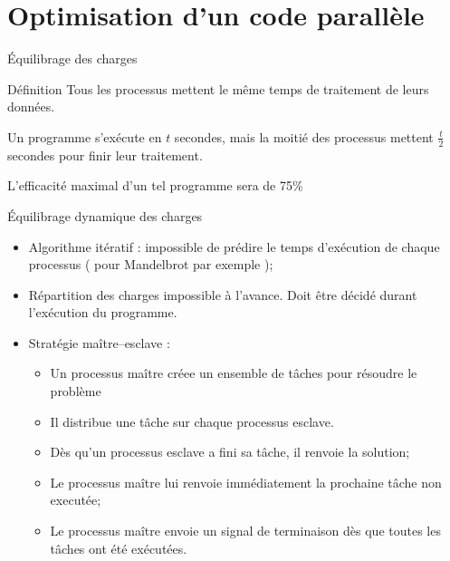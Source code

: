 \documentclass[handout]{beamer}
\begin{document}
\section{Optimisation d'un code parallèle}
\begin{frame}[fragile]{\'Equilibrage des charges}

\begin{block}{Définition}
Tous les processus mettent le même temps de traitement de leurs
données.
\end{block}

\begin{example}
Un programme s'exécute en $t$ secondes, mais la moitié des processus
mettent $\frac{t}{2}$ secondes pour finir leur traitement.

L'efficacité maximal d'un tel programme sera de 75\%
\end{example}
\end{frame}

\begin{frame}[fragile]{\'Equilibrage dynamique des charges}

\begin{itemize}
\item Algorithme itératif : impossible de prédire le temps d'exécution de chaque processus ( pour Mandelbrot
par exemple );
\item Répartition des charges impossible à l'avance. Doit être décidé durant l'exécution du programme.
\item Stratégie maître--esclave :
\begin{itemize}
\item Un processus maître créee un ensemble de tâches pour résoudre le problème
\item Il distribue une tâche sur chaque processus esclave.
\item D\`es qu'un processus esclave a fini sa tâche, il renvoie la solution;
\item Le processus maître lui renvoie immédiatement la prochaine tâche non executée;
\item Le processus maître envoie un signal de terminaison dès que toutes les tâches
ont été exécutées.
\end{itemize}
\end{itemize}
\end{frame}
\end{document}

